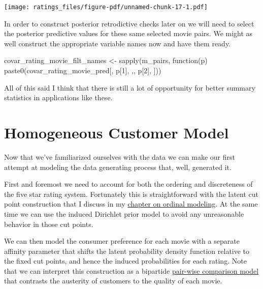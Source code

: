 \documentclass[
  letterpaper,
  DIV=11,
  numbers=noendperiod]{scrartcl}
\newenvironment{Shaded}{\begin{snugshade}}{\end{snugshade}}
\newcommand{\ControlFlowTok}[1]{\textcolor[rgb]{0.00,0.23,0.31}{#1}}
\newcommand{\DecValTok}[1]{\textcolor[rgb]{0.68,0.00,0.00}{#1}}
\newcommand{\FunctionTok}[1]{\textcolor[rgb]{0.28,0.35,0.67}{#1}}
\newcommand{\NormalTok}[1]{\textcolor[rgb]{0.00,0.23,0.31}{#1}}
\newcommand{\OtherTok}[1]{\textcolor[rgb]{0.00,0.23,0.31}{#1}}
\newcommand{\StringTok}[1]{\textcolor[rgb]{0.13,0.47,0.30}{#1}}
\begin{document}
\texttt{[image: ratings\_files/figure-pdf/unnamed-chunk-17-1.pdf]}

In order to construct posterior retrodictive checks later on we will
need to select the posterior predictive values for these same selected
movie pairs. We might as well construct the appropriate variable names
now and have them ready.

\begin{Shaded}
\begin{Highlighting}[]
\NormalTok{covar\_rating\_movie\_filt\_names }\OtherTok{\textless{}{-}}
  \FunctionTok{sapply}\NormalTok{(m\_pairs,}
         \ControlFlowTok{function}\NormalTok{(p) }\FunctionTok{paste0}\NormalTok{(}\StringTok{\textquotesingle{}covar\_rating\_movie\_pred[\textquotesingle{}}\NormalTok{,}
\NormalTok{                            p[}\DecValTok{1}\NormalTok{], }\StringTok{\textquotesingle{},\textquotesingle{}}\NormalTok{, p[}\DecValTok{2}\NormalTok{], }\StringTok{\textquotesingle{}]\textquotesingle{}}\NormalTok{))}
\end{Highlighting}
\end{Shaded}

All of this said I think that there is still a lot of opportunity for
better summary statistics in applications like these.

\section{Homogeneous Customer Model}\label{homogeneous-customer-model}

Now that we've familiarized ourselves with the data we can make our
first attempt at modeling the data generating process that, well,
generated it.

First and foremost we need to account for both the ordering and
discreteness of the five star rating system. Fortunately this is
straightforward with the latent cut point construction that I discuss in
my
\href{https://betanalpha.github.io/assets/case_studies/ordinal_regression.html}{chapter
on ordinal modeling}. At the same time we can use the induced Dirichlet
prior model to avoid any unreasonable behavior in those cut points.

We can then model the consumer preference for each movie with a separate
affinity parameter that shifts the latent probability density function
relative to the fixed cut points, and hence the induced probabilities
for each rating. Note that we can interpret this construction as a
bipartide
\href{https://betanalpha.github.io/assets/chapters_html/pairwise_comparison_modeling.html}{pair-wise
comparison model} that contrasts the austerity of customers to the
quality of each movie.
\end{document}
